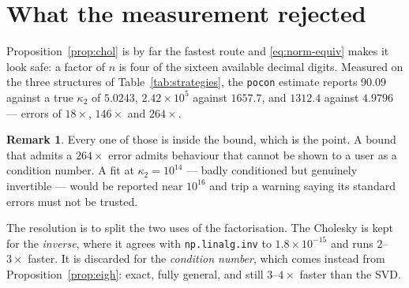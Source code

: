 \documentclass[11pt,a4paper]{article}
\theoremstyle{plain}
\theoremstyle{definition}
\newtheorem{remark}[proposition]{Remark}
\newcommand{\cond}{\kappa}
\begin{document}
\section{What the measurement rejected}

Proposition~\ref{prop:chol} is by far the fastest route and \eqref{eq:norm-equiv} makes it look
safe: a factor of $n$ is four of the sixteen available decimal digits. Measured on the three
structures of Table~\ref{tab:strategies}, the \texttt{pocon} estimate reports $90.09$ against a
true $\cond_2$ of $5.0243$, $2.42\times10^{5}$ against $1657.7$, and $1312.4$ against $4.9796$
--- errors of $18\times$, $146\times$ and $264\times$.

\begin{remark}
Every one of those is inside the bound, which is the point. A bound that admits a $264\times$
error admits behaviour that cannot be shown to a user as a condition number. A fit at
$\cond_2 = 10^{14}$ --- badly conditioned but genuinely invertible --- would be reported near
$10^{16}$ and trip a warning saying its standard errors must not be trusted.
\end{remark}

The resolution is to split the two uses of the factorisation. The Cholesky is kept for the
\emph{inverse}, where it agrees with \texttt{np.linalg.inv} to $1.8\times10^{-15}$ and runs
$2$--$3\times$ faster. It is discarded for the \emph{condition number}, which comes instead from
Proposition~\ref{prop:eigh}: exact, fully general, and still $3$--$4\times$ faster than the SVD.
\end{document}
